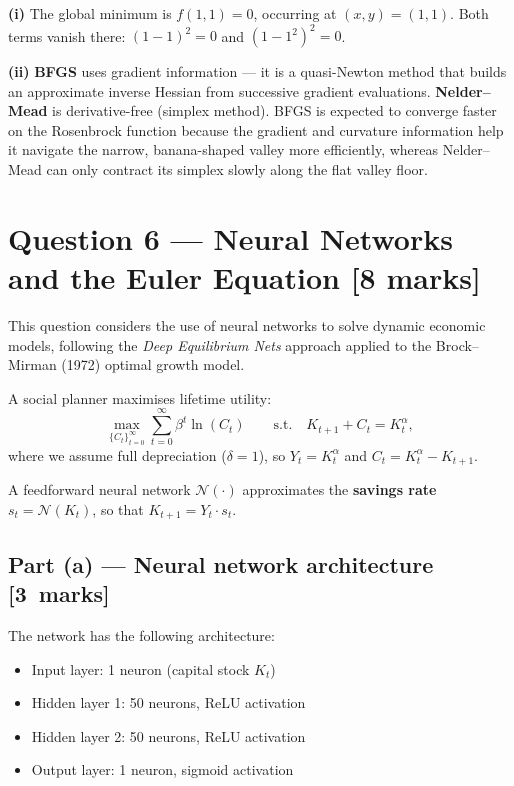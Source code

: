 \documentclass[11pt,a4paper]{article}
\newcommand{\mkpts}[1]{\hfill\textbf{[#1~marks]}}
\begin{document}
\begin{solution}
\textbf{(i)} The global minimum is $f(1,1) = 0$, occurring at $(x,y) = (1,1)$.  Both terms vanish there: $(1-1)^2 = 0$ and $(1-1^2)^2 = 0$.

\medskip

\textbf{(ii)} \textbf{BFGS} uses gradient information --- it is a quasi-Newton method that builds an approximate inverse Hessian from successive gradient evaluations.  \textbf{Nelder--Mead} is derivative-free (simplex method).  BFGS is expected to converge faster on the Rosenbrock function because the gradient and curvature information help it navigate the narrow, banana-shaped valley more efficiently, whereas Nelder--Mead can only contract its simplex slowly along the flat valley floor.
\end{solution}


\newpage

\section*{Question 6 --- Neural Networks and the Euler Equation \hfill [8 marks]}

This question considers the use of neural networks to solve dynamic economic models, following the \emph{Deep Equilibrium Nets} approach applied to the Brock--Mirman (1972) optimal growth model.

A social planner maximises lifetime utility:
\[
\max_{\{C_t\}_{t=0}^{\infty}} \sum_{t=0}^{\infty} \beta^t \ln(C_t) \qquad \text{s.t.} \quad K_{t+1} + C_t = K_t^{\alpha},
\]
where we assume full depreciation ($\delta=1$), so $Y_t = K_t^{\alpha}$ and $C_t = K_t^{\alpha} - K_{t+1}$.

A feedforward neural network $\mathcal{N}(\cdot)$ approximates the \textbf{savings rate} $s_t = \mathcal{N}(K_t)$, so that $K_{t+1} = Y_t \cdot s_t$.

\subsection*{Part (a) --- Neural network architecture \mkpts{3}}

The network has the following architecture:
\begin{itemize}[nosep]
\item Input layer: 1 neuron (capital stock $K_t$)
\item Hidden layer 1: 50 neurons, ReLU activation
\item Hidden layer 2: 50 neurons, ReLU activation
\item Output layer: 1 neuron, sigmoid activation
\end{itemize}
\end{document}
